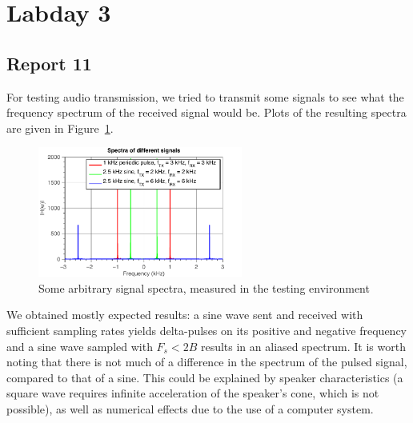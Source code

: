 \documentclass[11pt,titlepage]{report}
\begin{document}
\section{Labday 3}
\subsection{Report 11}
For testing audio transmission, we tried to transmit some signals to see what the frequency spectrum of the received signal would be. Plots of the resulting spectra are given in Figure~\ref{fig:rep11-test-spectra}.

\begin{figure}[H]
	\centering
	\includegraphics[width=0.6\textwidth]{../../deliverable-7-resources/figures/ass-1/report-11-12-13/ass-1-report-11-random-signals.pdf}
	\caption{Some arbitrary signal spectra, measured in the testing environment}
	\label{fig:rep11-test-spectra}
\end{figure}

We obtained mostly expected results: a sine wave sent and received with sufficient sampling rates yields delta-pulses on its positive and negative frequency and a sine wave sampled with $F_s < 2B$ results in an aliased spectrum. It is worth noting that there is not much of a difference in the spectrum of the pulsed signal, compared to that of a sine. This could be explained by speaker characteristics (a square wave requires infinite acceleration of the speaker's cone, which is not possible), as well as numerical effects due to the use of a computer system.
\end{document}
